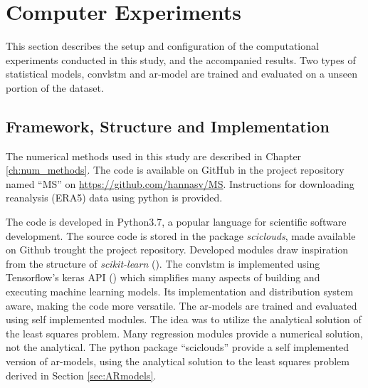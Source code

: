 \section{Computer Experiments} \label{ch:computer_experiments}
This section describes the setup and configuration of the computational experiments conducted in this study, and the accompanied results. Two types of statistical models, \acrshort{convlstm} and \acrshort{ar}-model are trained and evaluated on a unseen portion of the dataset. 

\subsection{Framework, Structure and Implementation} \label{sec:structure_and_implementations} \label{sec:framework}
The numerical methods used in this study are described in Chapter \ref{ch:num_methods}. The code is available on GitHub in the project repository named ``MS'' on \href{https://github.com/hannasv/MS}{https://github.com/hannasv/MS}. Instructions for downloading reanalysis (ERA5) data using python is provided.


The code is developed in Python3.7, a popular language for scientific software development. The source code is stored in the package \textit{sciclouds}, made available on Github trought the project repository. Developed modules draw inspiration from the structure of \textit{scikit-learn} (\cite{sklearn_api}).%
The \acrshort{convlstm} is implemented using Tensorflow's keras API (\cite{tensorflow2015}) which simplifies many aspects of building and executing machine learning models. Its implementation and distribution system aware, making the code more versatile. %
The \acrshort{ar}-models are trained and evaluated using self implemented modules. The idea was to utilize the analytical solution of the least squares problem. Many regression modules provide a numerical solution, not the analytical. The python package ``sciclouds'' provide a self implemented version of \acrshort{ar}-models, using the analytical solution to the least squares problem derived in Section \ref{sec:ARmodels}.

